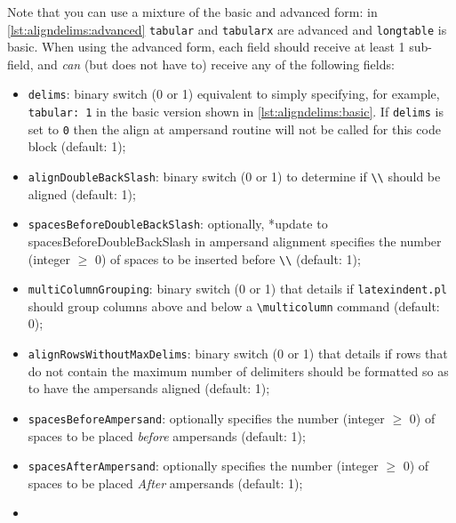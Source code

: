  Note that you can use a mixture of the basic and advanced form: in
 \cref{lst:aligndelims:advanced} \texttt{tabular} and \texttt{tabularx} are advanced and
 \texttt{longtable} is basic. When using the advanced form, each field should receive at
 least 1 sub-field, and \emph{can} (but does not have to) receive any of the following
 fields:
 \begin{itemize}
  \item \texttt{delims}: binary switch (0 or 1) equivalent to simply specifying, for
        example, \texttt{tabular: 1} in the basic version shown in \cref{lst:aligndelims:basic}.
        If \texttt{delims} is set to \texttt{0} then the align at ampersand routine will not be
        called for this code block (default: 1);
  \item \texttt{alignDoubleBackSlash}: binary switch (0 or 1) to determine if
        \lstinline!\\!
        should be aligned (default: 1);
  \item \texttt{spacesBeforeDoubleBackSlash}: optionally,%
        *{update to spacesBeforeDoubleBackSlash in ampersand alignment}
        specifies the number (integer $\geq$ 0) of spaces to be inserted before
        \lstinline!\\! (default: 1); %
  \item {} \texttt{multiColumnGrouping}: binary
        switch (0 or 1) that details if \texttt{latexindent.pl} should group columns
        above and below a \lstinline!\multicolumn! command (default: 0);
  \item {}
        \texttt{alignRowsWithoutMaxDelims}: binary switch (0 or 1) that details if rows
        that do not contain the maximum number of delimiters should be formatted so as to
        have the ampersands aligned (default: 1);
  \item {}\texttt{spacesBeforeAmpersand}: optionally specifies the number
        (integer $\geq$ 0) of spaces to be placed \emph{before} ampersands (default: 1);
  \item {}\texttt{spacesAfterAmpersand}: optionally specifies the number (integer
        $\geq$ 0) of spaces to be placed \emph{After} ampersands (default: 1);
  \item {}
\end{itemize}
